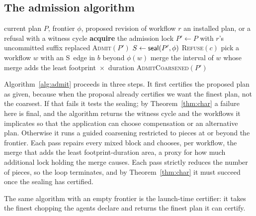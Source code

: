 \subsection{The admission algorithm}

\begin{algorithm}[t]
\caption{Admitting a plan revision}
\label{alg:admit}
\begin{algorithmic}[1]
\Require current plan $P$, frontier $\phi$, proposed revision of workflow $r$
\Ensure an installed plan, or a refusal with a witness cycle
\State \textbf{acquire} the admission lock 
\State $P' \gets P$ with $r$'s uncommitted suffix replaced
  \State \Return \textsc{Admit}$(P')$ 
\EndIf
\State $S \gets \mathsf{seal}(P',\phi)$
  \State \Return \textsc{Refuse}$(c)$ 
\EndIf
\Repeat {}
    \State pick a workflow $w$ with an S~edge in $b$ beyond $\phi(w)$
    \State merge the interval of $w$ whose merge adds the least
      footprint~$\times$~duration
  \EndFor
{}
\State \Return \textsc{AdmitCoarsened}$(P')$
\end{algorithmic}
\end{algorithm}

Algorithm~\ref{alg:admit} proceeds in three steps. It first certifies the
proposed plan as given, because when the proposal already certifies we want
the finest plan, not the coarsest. If that fails it tests the sealing; by
Theorem~\ref{thm:char} a failure here is final, and the algorithm returns the
witness cycle and the workflows it implicates so that the application can
choose compensation or an alternative plan. Otherwise it runs a guided
coarsening restricted to pieces at or beyond the frontier. Each pass repairs
every mixed block and chooses, per workflow, the merge that adds the least
footprint-duration area, a proxy for how much additional lock holding the
merge causes. Each pass strictly reduces the number of pieces, so the loop
terminates, and by Theorem~\ref{thm:char} it must succeed once the sealing has
certified.

The same algorithm with an empty frontier is the launch-time certifier: it
takes the finest chopping the agents declare and returns the finest plan it
can certify.
